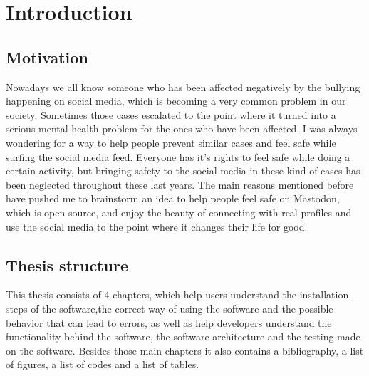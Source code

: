 \chapter{Introduction}
\label{ch:intro}

\section{Motivation}
Nowadays we all know someone who has been affected negatively
by the bullying happening on social media, which is becoming
a very common problem in our society. Sometimes those cases
escalated to the point where it turned into a serious mental
health problem for the ones who have been affected. I was
always wondering for a way to help people prevent similar
cases and feel safe while surfing the social media feed.
Everyone has it's rights to feel safe while doing a certain
activity, but bringing safety to the social media in these
kind of cases has been neglected throughout these last years.
\newline
The main reasons mentioned before have pushed me to brainstorm
an idea to help people feel safe on Mastodon, which is open source,
and enjoy the beauty of connecting with real profiles and use the
social media to the point where it changes their life for good.

\section{Thesis structure}
This thesis consists of 4 chapters, which help users understand the
installation steps of the software,the correct way of using the software
and the possible behavior that can lead to errors, as well as help developers
understand the functionality behind the software,
the software architecture and the testing made on the software.
\newline
Besides those main chapters it also contains a bibliography,
a list of figures, a list of codes and a list of tables.
